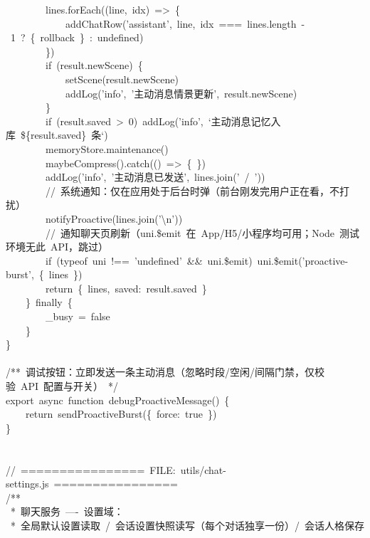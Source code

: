 \documentclass[a4paper,10pt]{article}
\begin{document}
{\ttfamily\footnotesize\raggedright
~~~~~~~~lines.forEach((line,~idx)~=>~\{\\
~~~~~~~~~~~~addChatRow('assistant',~line,~idx~===~lines.length~-~1~?~\{~rollback~\}~:~undefined)\\
~~~~~~~~\})\\
~~~~~~~~if~(result.newScene)~\{\\
~~~~~~~~~~~~setScene(result.newScene)\\
~~~~~~~~~~~~addLog('info',~'主动消息情景更新',~result.newScene)\\
~~~~~~~~\}\\
~~~~~~~~if~(result.saved~>~0)~addLog('info',~`主动消息记忆入库~\$\{result.saved\}~条`)\\
~~~~~~~~memoryStore.maintenance()\\
~~~~~~~~maybeCompress().catch(()~=>~\{~\})\\
~~~~~~~~addLog('info',~'主动消息已发送',~lines.join('~/~'))\\
~~~~~~~~//~系统通知：仅在应用处于后台时弹（前台刚发完用户正在看，不打扰）\\
~~~~~~~~notifyProactive(lines.join('\textbackslash{}n'))\\
~~~~~~~~//~通知聊天页刷新（uni.\$emit~在~App/H5/小程序均可用；Node~测试环境无此~API，跳过）\\
~~~~~~~~if~(typeof~uni~!==~'undefined'~\&\&~uni.\$emit)~uni.\$emit('proactive-burst',~\{~lines~\})\\
~~~~~~~~return~\{~lines,~saved:~result.saved~\}\\
~~~~\}~finally~\{\\
~~~~~~~~\_busy~=~false\\
~~~~\}\\
\}\\
\mbox{}\\
/**~调试按钮：立即发送一条主动消息（忽略时段/空闲/间隔门禁，仅校验~API~配置与开关）~*/\\
export~async~function~debugProactiveMessage()~\{\\
~~~~return~sendProactiveBurst(\{~force:~true~\})\\
\}\\
\mbox{}\\
\mbox{}\\
//~================~FILE:~utils/chat-settings.js~================\\
/**\\
~*~聊天服务~----~设置域：\\
~*~全局默认设置读取~/~会话设置快照读写（每个对话独享一份）/~会话人格保存\\
}
\end{document}
